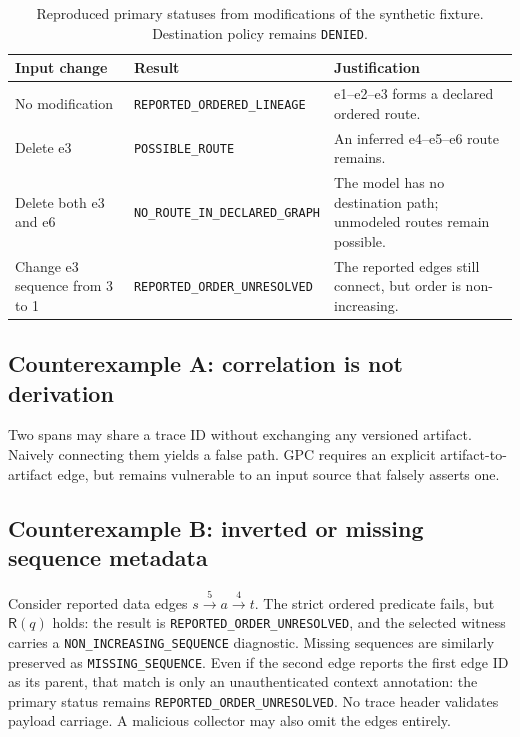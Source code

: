 \documentclass[11pt,letterpaper]{article}
\newcommand{\code}[1]{\texttt{#1}}
\newcommand{\st}[1]{\texttt{\scriptsize #1}}
\newcommand{\RR}{\mathsf{R}}
\begin{document}
\begin{table}[htbp]
\centering\small
\caption{Reproduced primary statuses from modifications of the synthetic fixture. Destination policy remains \st{DENIED}.}
\label{tab:fixture}
\begin{tabularx}{\textwidth}{@{}p{1.64in}p{1.96in}L@{}}
\toprule
\textbf{Input change} & \textbf{Result} & \textbf{Justification}\\
\midrule
No modification & \st{REPORTED\_ORDERED\_LINEAGE} & e1--e2--e3 forms a declared ordered route.\\
Delete e3 & \st{POSSIBLE\_ROUTE} & An inferred e4--e5--e6 route remains.\\
Delete both e3 and e6 & \st{NO\_ROUTE\_IN\_DECLARED\_GRAPH} & The model has no destination path; unmodeled routes remain possible.\\
Change e3 sequence from 3 to 1 & \st{REPORTED\_ORDER\_UNRESOLVED} & The reported edges still connect, but order is non-increasing.\\
\bottomrule
\end{tabularx}
\end{table}

\subsection{Counterexample A: correlation is not derivation}
Two spans may share a trace ID without exchanging any versioned artifact. Naively connecting them yields a false path. GPC requires an explicit artifact-to-artifact edge, but remains vulnerable to an input source that falsely asserts one.

\subsection{Counterexample B: inverted or missing sequence metadata}
Consider reported data edges \(s\xrightarrow{5}a\xrightarrow{4}t\). The strict ordered predicate fails, but \(\RR(q)\) holds: the result is \st{REPORTED\_ORDER\_UNRESOLVED}, and the selected witness carries a \code{NON\_INCREASING\_SEQUENCE} diagnostic. Missing sequences are similarly preserved as \code{MISSING\_SEQUENCE}. Even if the second edge reports the first edge ID as its parent, that match is only an unauthenticated context annotation: the primary status remains \st{REPORTED\_ORDER\_UNRESOLVED}. No trace header validates payload carriage. A malicious collector may also omit the edges entirely.
\end{document}
